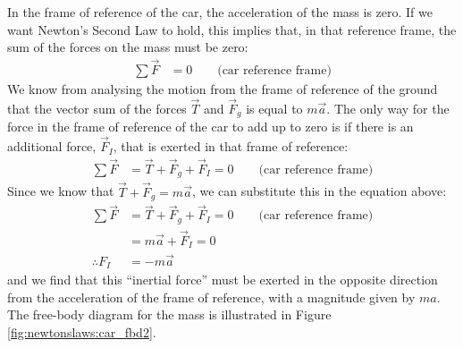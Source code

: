 In the frame of reference of the car, the acceleration of the mass is zero. If we want Newton's Second Law to hold, this implies that, in that reference frame, the sum of the forces on the mass must be zero:
\begin{align*}
\sum \vec F & = 0\quad\quad\text{(car reference frame)}
\end{align*}
We know from analysing the motion from the frame of reference of the ground that the vector sum of the forces $\vec T$ and $\vec F_g$ is equal to $m\vec a$. The only way for the force in the frame of reference of the car to add up to zero is if there is an additional force, $\vec F_I$, that is exerted in that frame of reference:
\begin{align*}
\sum \vec F &= \vec T + \vec F_g + \vec F_I =0\quad\quad\text{(car reference frame)}
\end{align*}
Since we know that $\vec T + \vec F_g=m\vec a$, we can substitute this in the equation above:
\begin{align*}
\sum \vec F &= \vec T + \vec F_g + \vec F_I =0\quad\quad\text{(car reference frame)}\\
&=m\vec a+\vec F_I = 0\\
\therefore F_I &= -m\vec a
\end{align*}
and we find that this ``inertial force'' must be exerted in the opposite direction from the acceleration of the frame of reference, with a magnitude given by $ma$. The free-body diagram for the mass is illustrated in Figure \ref{fig:newtonslaws:car_fbd2}. 

